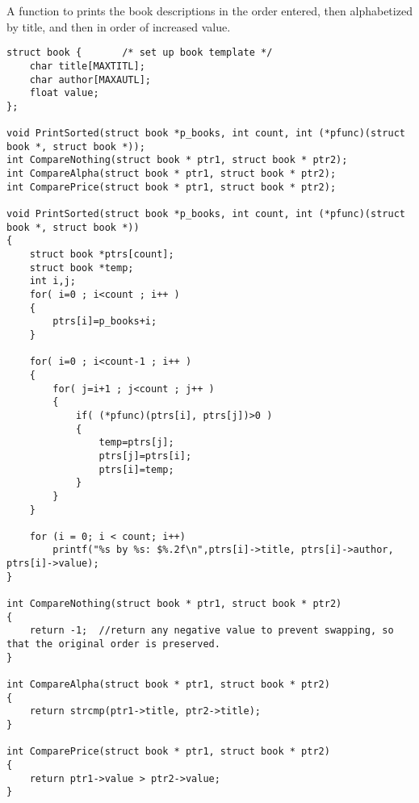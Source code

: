 \begin{question}
  A function to prints the book descriptions in
  the order entered, then alphabetized by title, and then in order of increased value.
\end{question}
\begin{solution}
  \begin{verbatim}
struct book {		/* set up book template */
	char title[MAXTITL];
	char author[MAXAUTL];
	float value;
};

void PrintSorted(struct book *p_books, int count, int (*pfunc)(struct book *, struct book *));
int CompareNothing(struct book * ptr1, struct book * ptr2);
int CompareAlpha(struct book * ptr1, struct book * ptr2);
int ComparePrice(struct book * ptr1, struct book * ptr2);

void PrintSorted(struct book *p_books, int count, int (*pfunc)(struct book *, struct book *))
{
	struct book *ptrs[count];
	struct book *temp;
	int i,j;
	for( i=0 ; i<count ; i++ )
	{
		ptrs[i]=p_books+i;
	}

	for( i=0 ; i<count-1 ; i++ )
	{
		for( j=i+1 ; j<count ; j++ )
		{
			if( (*pfunc)(ptrs[i], ptrs[j])>0 )
			{
				temp=ptrs[j];
				ptrs[j]=ptrs[i];
				ptrs[i]=temp;
			}
		}
	}
	
	for (i = 0; i < count; i++)
		printf("%s by %s: $%.2f\n",ptrs[i]->title, ptrs[i]->author, ptrs[i]->value);
}

int CompareNothing(struct book * ptr1, struct book * ptr2)
{
	return -1;	//return any negative value to prevent swapping, so that the original order is preserved.
}

int CompareAlpha(struct book * ptr1, struct book * ptr2)
{
	return strcmp(ptr1->title, ptr2->title);
}

int ComparePrice(struct book * ptr1, struct book * ptr2)
{
	return ptr1->value > ptr2->value;
}
  
  \end{verbatim}
\end{solution}

